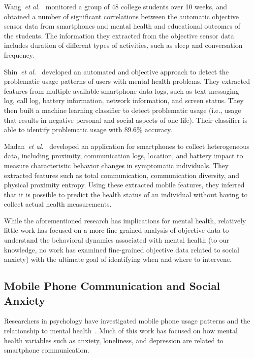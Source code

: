 Wang~\emph{et al.}~\cite{wang2014studentlife} monitored a group of 48 college students over 10 weeks, and obtained a number of significant correlations between the automatic objective sensor data from smartphones and mental health and educational outcomes of the students. The information they extracted from the objective sensor data includes duration of different types of activities, such as sleep and conversation frequency. %

Shin~\emph{et al.}~\cite{shin2013automatically} developed an automated and objective approach to detect the problematic usage patterns of users with mental health problems. They extracted features from multiple available smartphone data logs, such as text messaging log, call log, battery information, network information, and screen status. They then built a machine learning classifier to detect problematic usage (i.e., usage that results in negative personal and social aspects of one life).  Their classifier is able to identify problematic usage with 89.6\% accuracy.
% 
% 

Madan~\emph{et al.}~\cite{madan2012sensing,madan2010social} developed an application for smartphones to collect heterogeneous data, including proximity, communication logs, location, and battery impact to measure characteristic behavior changes in symptomatic individuals. They extracted features such as total communication, communication diversity, and physical proximity entropy. Using these extracted mobile features, they inferred that it is possible to predict the health status of an individual without having to collect actual health measurements.

While the aforementioned research has implications for mental health, relatively little work has focused on a more fine-grained analysis of objective data to understand the behavioral dynamics associated with mental health (to our knowledge, no work has examined fine-grained objective data related to social anxiety) with the ultimate goal of identifying when and where to intervene. 

\subsection{Mobile Phone Communication and Social Anxiety}
Researchers in psychology have investigated mobile phone usage patterns and the relationship to mental health~\cite{gao2016smartphone,lundy2016social,elhai2017}.  Much of this work has focused on how mental health variables such as anxiety, loneliness, and depression are related to smartphone communication.
 
